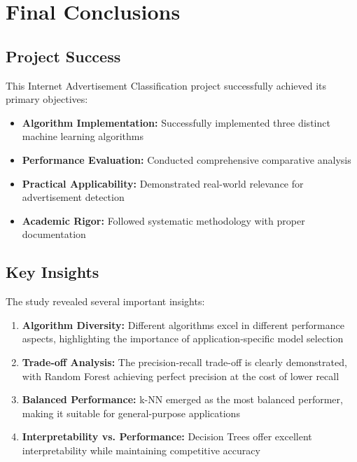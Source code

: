 \section{Final Conclusions}

\subsection{Project Success}

This Internet Advertisement Classification project successfully achieved its primary objectives:

\begin{itemize}
    \item \textbf{Algorithm Implementation:} Successfully implemented three distinct machine learning algorithms
    \item \textbf{Performance Evaluation:} Conducted comprehensive comparative analysis
    \item \textbf{Practical Applicability:} Demonstrated real-world relevance for advertisement detection
    \item \textbf{Academic Rigor:} Followed systematic methodology with proper documentation
\end{itemize}

\subsection{Key Insights}

The study revealed several important insights:

\begin{enumerate}
    \item \textbf{Algorithm Diversity:} Different algorithms excel in different performance aspects, highlighting the importance of application-specific model selection
    
    \item \textbf{Trade-off Analysis:} The precision-recall trade-off is clearly demonstrated, with Random Forest achieving perfect precision at the cost of lower recall
    
    \item \textbf{Balanced Performance:} k-NN emerged as the most balanced performer, making it suitable for general-purpose applications
    
    \item \textbf{Interpretability vs. Performance:} Decision Trees offer excellent interpretability while maintaining competitive accuracy
\end{enumerate}

